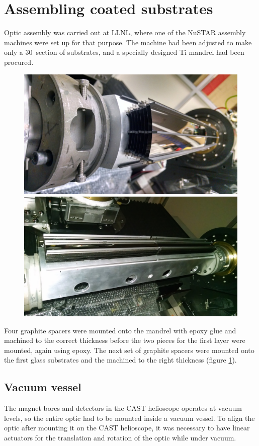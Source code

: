 \section{Assembling coated substrates}
Optic assembly was carried out at LLNL, where one of the NuSTAR assembly machines were set up for that purpose. The machine had been adjusted to make only a 30\degr\ section of substrates, and a specially designed Ti mandrel had been procured.

\begin{figure}[htbp]
  \centering
  \includegraphics[width=0.45\linewidth]{figures/cast/assembly1.jpg}
  \includegraphics[width=0.45\linewidth]{figures/cast/assembly2.jpg}
  \caption{\footnotesize }
  \label{fig:cast_assembly}
\end{figure}

Four graphite spacers were mounted onto the mandrel with epoxy glue and machined to the correct thickness before the two pieces for the first layer were mounted, again using epoxy. The next set of graphite spacers were mounted onto the first glass substrates and the machined to the right thickness (figure \ref{fig:cast_assembly}).

\subsection{Vacuum vessel}
The magnet bores and detectors in the CAST helioscope operates at vacuum levels, so the entire optic had to be mounted inside a vacuum vessel. To align the optic after mounting it on the CAST helioscope, it was necessary to have linear actuators for the translation and rotation of the optic while under vacuum.

